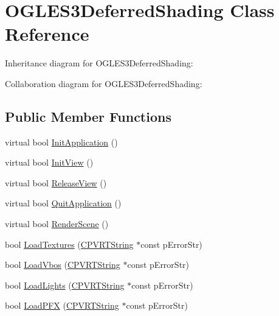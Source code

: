 \hypertarget{class_o_g_l_e_s3_deferred_shading}{\section{O\+G\+L\+E\+S3\+Deferred\+Shading Class Reference}
\label{class_o_g_l_e_s3_deferred_shading}
}


Inheritance diagram for O\+G\+L\+E\+S3\+Deferred\+Shading\+:


Collaboration diagram for O\+G\+L\+E\+S3\+Deferred\+Shading\+:
\subsection*{Public Member Functions}
\begin{DoxyCompactItemize}
\item 
virtual bool \hyperlink{class_o_g_l_e_s3_deferred_shading_a2c0ed9c939c83e76f32e0544c6a51975}{Init\+Application} ()
\item 
virtual bool \hyperlink{class_o_g_l_e_s3_deferred_shading_abcfa480d9d21ac94abd583307e81215a}{Init\+View} ()
\item 
virtual bool \hyperlink{class_o_g_l_e_s3_deferred_shading_a7f38aea54bc80744ba226f6db183b693}{Release\+View} ()
\item 
virtual bool \hyperlink{class_o_g_l_e_s3_deferred_shading_ae4a3ca2cf5d1ad407b33f027f54cf81f}{Quit\+Application} ()
\item 
virtual bool \hyperlink{class_o_g_l_e_s3_deferred_shading_a65b2f29d4627953888de63c1052852f5}{Render\+Scene} ()
\item 
bool \hyperlink{class_o_g_l_e_s3_deferred_shading_a68023121473d6250f56c813dac5d0204}{Load\+Textures} (\hyperlink{class_c_p_v_r_t_string}{C\+P\+V\+R\+T\+String} $\ast$const p\+Error\+Str)
\item 
bool \hyperlink{class_o_g_l_e_s3_deferred_shading_a8765d72b99164cb7a3bbdc8efa4a9e9b}{Load\+Vbos} (\hyperlink{class_c_p_v_r_t_string}{C\+P\+V\+R\+T\+String} $\ast$const p\+Error\+Str)
\item 
bool \hyperlink{class_o_g_l_e_s3_deferred_shading_a517b7c3d27650a5a8b61f060298055d1}{Load\+Lights} (\hyperlink{class_c_p_v_r_t_string}{C\+P\+V\+R\+T\+String} $\ast$const p\+Error\+Str)
\item 
bool \hyperlink{class_o_g_l_e_s3_deferred_shading_ad689392f309130d83fc6150abf02e9e0}{Load\+P\+F\+X} (\hyperlink{class_c_p_v_r_t_string}{C\+P\+V\+R\+T\+String} $\ast$const p\+Error\+Str)
\item 

\end{DoxyCompactItemize}
